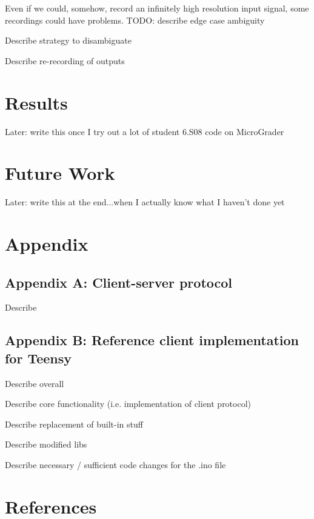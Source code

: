 \documentclass[12pt]{article}
\begin{document}
Even if we could, somehow, record an infinitely high resolution input signal, some recordings could have problems.  TODO: describe edge case ambiguity

Describe strategy to disambiguate

Describe re-recording of outputs

\newpage
\section{Results}
Later: write this once I try out a lot of student 6.S08 code on MicroGrader

\newpage
\section{Future Work}
Later: write this at the end...when I actually know what I haven't done yet 

\newpage
\section{Appendix}

\subsection{Appendix A: Client-server protocol}
\label{sec:protocol}
Describe

\subsection{Appendix B: Reference client implementation for Teensy}
\label{sec:teensy}
Describe overall

Describe core functionality (i.e. implementation of client protocol)

Describe replacement of built-in stuff

Describe modified libs

Describe necessary / sufficient code changes for the .ino file

\newpage
\section{References}
\end{document}
